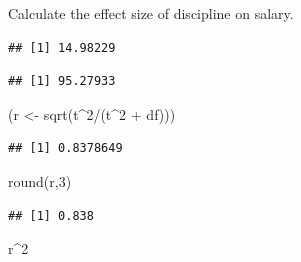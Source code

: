 \documentclass[
]{book}
\newenvironment{Shaded}{\begin{snugshade}}{\end{snugshade}}
\newcommand{\CommentTok}[1]{\textcolor[rgb]{0.56,0.35,0.01}{\textit{#1}}}
\newcommand{\DecValTok}[1]{\textcolor[rgb]{0.00,0.00,0.81}{#1}}
\newcommand{\FunctionTok}[1]{\textcolor[rgb]{0.00,0.00,0.00}{#1}}
\newcommand{\NormalTok}[1]{#1}
\newcommand{\OtherTok}[1]{\textcolor[rgb]{0.56,0.35,0.01}{#1}}
\newcommand{\SpecialCharTok}[1]{\textcolor[rgb]{0.00,0.00,0.00}{#1}}
\begin{document}
Calculate the effect size of discipline on salary.

\begin{Shaded}
\end{Shaded}

\begin{verbatim}
## [1] 14.98229
\end{verbatim}

\begin{Shaded}
\end{Shaded}

\begin{verbatim}
## [1] 95.27933
\end{verbatim}

\begin{Shaded}
\begin{Highlighting}[]
\NormalTok{(r }\OtherTok{\textless{}{-}} \FunctionTok{sqrt}\NormalTok{(t}\SpecialCharTok{\^{}}\DecValTok{2}\SpecialCharTok{/}\NormalTok{(t}\SpecialCharTok{\^{}}\DecValTok{2} \SpecialCharTok{+}\NormalTok{ df)))}
\end{Highlighting}
\end{Shaded}

\begin{verbatim}
## [1] 0.8378649
\end{verbatim}

\begin{Shaded}
\begin{Highlighting}[]
\FunctionTok{round}\NormalTok{(r,}\DecValTok{3}\NormalTok{)}
\end{Highlighting}
\end{Shaded}

\begin{verbatim}
## [1] 0.838
\end{verbatim}

\begin{Shaded}
\begin{Highlighting}[]
\NormalTok{r}\SpecialCharTok{\^{}}\DecValTok{2}
\end{Highlighting}
\end{Shaded}
\end{document}
